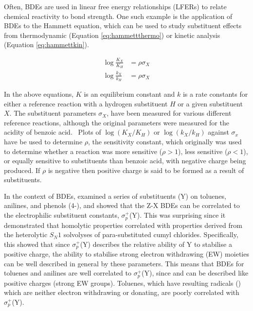 Often, BDEs are used in linear free energy relationships (LFERs) to relate
chemical reactivity to bond strength. One such example\cite{Pratt2004} is the
application of BDEs to the Hammett equation\cite{Anslyn2006}, which can be used
to study substituent effects from thermodynamic (Equation
\ref{eq:hammettthermo}) or kinetic analysis (Equation \ref{eq:hammettkin}).

\begin{align}
 \log\frac{K_X}{K_H} &= \rho \sigma_X \label{eq:hammettthermo} \\
 \log\frac{k_X}{k_H} &= \rho \sigma_X \label{eq:hammettkin}
\end{align}

\noindent In the above equations, $K$ is an equilibrium constant and $k$ is a
rate constants for either a reference reaction with a hydrogen substituent $H$
or a given substituent $X$. The substituent parameters $\sigma_X$, have been
measured for various different reference reactions, although the original
parameters were measured for the acidity of benzoic acid.\cite{Hammett1937}
~Plots of $\log(K_X/K_H)$ or $\log(k_X/k_H)$ against $\sigma_x$ have be used to
determine $\rho$, the sensitivity constant, which originally was used to determine
whether a reaction was more sensitive ($\rho > 1$), less sensitive ($\rho < 1$),
or equally sensitive to substituents than benzoic acid, with negative charge
being produced. If $\rho$ is negative then positive charge is said to be formed as a
result of substituents.

In the context of BDEs, \citet{Pratt2004} examined a series of substituents (Y)
on toluenes, anilines, and phenols (4-), and showed that the Z-X
BDEs can be correlated to the electrophilic substituent constants,
$\sigma_p^+$(Y). This was surprising since it demonstrated that homolytic
properties correlated with properties derived from the heterolytic $S_N1$
solvolyses of para-substituted cumyl chlorides.\cite{Brown1958} Specifically,
this showed that since $\sigma_p^+$(Y) describes the relative ability of Y to
stabilise a positive charge, the ability to stabilise strong electron
withdrawing (EW) moieties can be well described in general by these
parameters. This means that BDEs for toluenes and anilines are well correlated
to $\sigma_p^+$(Y), since  and  can be described like positive
charges (strong EW groups). Toluenes, which have resulting radicals ()
which are neither electron withdrawing or donating, are poorly correlated with
$\sigma_p^+$(Y).

